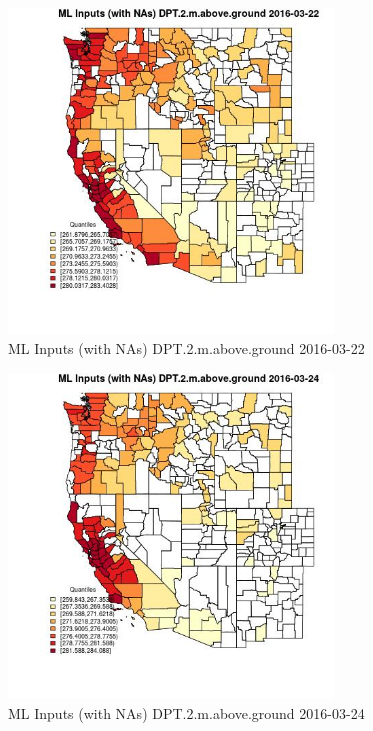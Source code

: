 \begin{figure} 
\centering  
\includegraphics[width=0.77\textwidth]{Code_Outputs/Report_ML_input_PM25_Step4_part_e_de_duplicated_aveswNAs_CountyDPT2mabovegroundMean2016-03-22_2016-03-22.jpg} 
\caption{\label{fig:Report_ML_input_PM25_Step4_part_e_de_duplicated_aveswNAsCountyDPT2mabovegroundMean2016-03-22_2016-03-22}ML Inputs (with NAs) DPT.2.m.above.ground 2016-03-22} 
\end{figure} 
 

\begin{figure} 
\centering  
\includegraphics[width=0.77\textwidth]{Code_Outputs/Report_ML_input_PM25_Step4_part_e_de_duplicated_aveswNAs_CountyDPT2mabovegroundMean2016-03-24_2016-03-24.jpg} 
\caption{\label{fig:Report_ML_input_PM25_Step4_part_e_de_duplicated_aveswNAsCountyDPT2mabovegroundMean2016-03-24_2016-03-24}ML Inputs (with NAs) DPT.2.m.above.ground 2016-03-24} 
\end{figure} 
 

